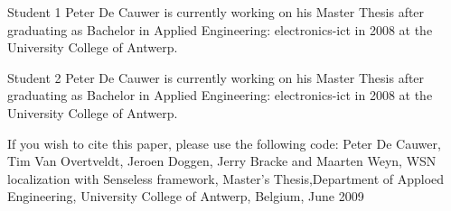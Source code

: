\documentclass[9pt,journal,compsoc,twoside, a4paper]{elab}
\begin{document}
\begin{IEEEbiography}{Student 1}
Peter De Cauwer is currently working
on his Master Thesis after graduating as
Bachelor in Applied Engineering: electronics-ict
in 2008 at the University College of Antwerp.
\end{IEEEbiography}
\begin{IEEEbiography}{Student 2}
Peter De Cauwer is currently working
on his Master Thesis after graduating as
Bachelor in Applied Engineering: electronics-ict
in 2008 at the University College of Antwerp.
\end{IEEEbiography}

If you wish to cite this paper, please use the following code:
Peter De Cauwer, Tim Van Overtveldt, Jeroen Doggen, Jerry Bracke and Maarten Weyn, WSN localization with Senseless framework, Master's Thesis,Department of Apploed Engineering, University College of Antwerp, Belgium, June 2009
\vfill

\end{document}
